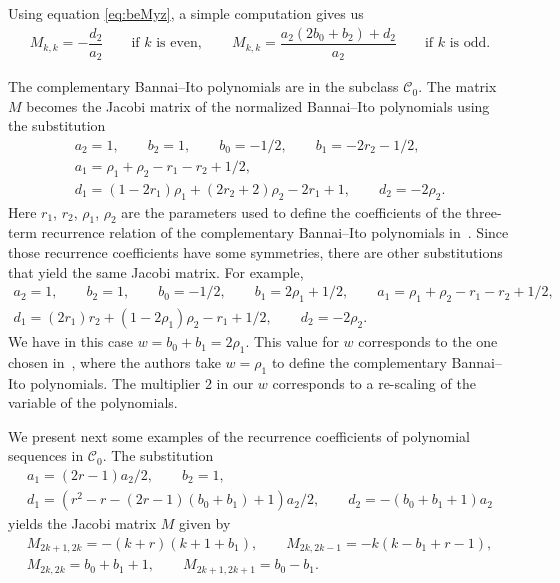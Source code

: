 \documentclass[pdftex]{sigma}
\def\cC{\mathcal C}
\numberwithin{equation}{section}
\begin{document}
Using equation \eqref{eq:beMyz}, a simple computation gives us
\begin{gather*}%
	M_{k,k}= - \dfrac{d_2}{a_2} \qquad \text{if $k$ is even}, \qquad
	M_{k,k}= \dfrac{a_2 (2 b_0+b_2) + d_2}{a_2} \qquad \text{if $k$ is odd}.
\end{gather*}

The complementary Bannai--Ito polynomials are in the subclass $\cC_0$. The matrix $M$ becomes the Jacobi matrix of the normalized Bannai--Ito polynomials using the substitution
\begin{gather*}
a_2=1,\qquad b_2=1,\qquad b_0=-1/2,\qquad b_1=-2 r_2 -1/2,\\
a_1=\rho_1+\rho_2-r_1-r_2 +1/2, \\
d_1=(1-2 r_1) \rho_1 +(2 r_2+2) \rho_2- 2 r_1+1,\qquad d_2=-2 \rho_2.
\end{gather*}
Here $r_1$, $r_2$, $\rho_1$, $\rho_2$ are the parameters used to define the coefficients of the three-term recurrence relation of the complementary Bannai--Ito polynomials in~\cite[equations (3.4) and (3.5)]{GenVZ2}. Since those recurrence coefficients have some symmetries, there are other substitutions that yield the same Jacobi matrix. For example,
\begin{gather*}
a_2=1,\qquad b_2=1,\qquad b_0=-1/2,\qquad b_1= 2 \rho_1 +1/2,\qquad a_1=\rho_1+\rho_2-r_1-r_2 +1/2, \\
 d_1=(2 r_1) r_2 +(1- 2 \rho_1) \rho_2 - r_1 +1/2,\qquad d_2=-2 \rho_2.
\end{gather*}
We have in this case $w=b_0+b_1=2 \rho_1$. This value for $w$ corresponds to the one chosen in~\cite[equation~(5.11)]{TsujiDunkl}, where the authors take $w=\rho_1$ to define the complementary Bannai--Ito polynomials. The multiplier $2$ in our $w$ corresponds to a re-scaling of the variable of the polynomials.

We present next some examples of the recurrence coefficients of polynomial sequences in $\cC_0$.
The substitution
\begin{gather*}
 a_1=(2r-1) a_2/2, \qquad b_2=1,\\
 d_1=(r^2-r -(2r-1)(b_0+b_1) +1) a_2/2, \qquad d_2=-(b_0+b_1+1)a_2
 \end{gather*}
yields the Jacobi matrix $M$ given by
\begin{gather*}%
	M_{2k+1,2k}= -(k+r) (k+1+b_1), \qquad
	M_{2k,2k-1}= -k (k-b_1+r-1),\\
	M_{2k,2k}= b_0+b_1+1,\qquad
	M_{2k+1,2k+1}= b_0-b_1.
\end{gather*}
\end{document}
